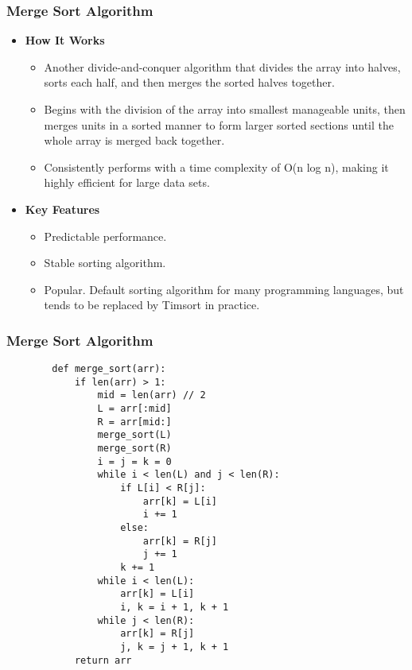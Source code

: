 \documentclass[compress,12pt,bookmark]{beamer}
\begin{document}
\begin{frame}[fragile]
    \frametitle{Merge Sort Algorithm}

    \begin{itemize}
        \item \textbf{How It Works}
              \begin{itemize}
                  \item Another divide-and-conquer algorithm that divides the array into halves, sorts each half, and then merges the sorted halves together.
                  \item Begins with the division of the array into smallest manageable units, then merges units in a sorted manner to form larger sorted sections until the whole array is merged back together.
                  \item Consistently performs with a time complexity of O(n log n), making it highly efficient for large data sets.
              \end{itemize}
        \item \textbf{Key Features}
              \begin{itemize}
                  \item Predictable performance.
                  \item Stable sorting algorithm.
                  \item Popular. Default sorting algorithm for many programming languages, but tends to be replaced by Timsort in practice.
              \end{itemize}
    \end{itemize}
\end{frame}

\begin{frame}[fragile]
    \frametitle{Merge Sort Algorithm}

    \scriptsize
    \begin{verbatim}
        def merge_sort(arr):
            if len(arr) > 1:
                mid = len(arr) // 2
                L = arr[:mid]
                R = arr[mid:]
                merge_sort(L)
                merge_sort(R)
                i = j = k = 0
                while i < len(L) and j < len(R):
                    if L[i] < R[j]:
                        arr[k] = L[i]
                        i += 1
                    else:
                        arr[k] = R[j]
                        j += 1
                    k += 1
                while i < len(L):
                    arr[k] = L[i]
                    i, k = i + 1, k + 1
                while j < len(R):
                    arr[k] = R[j]
                    j, k = j + 1, k + 1
            return arr
    \end{verbatim}
\end{frame}
\end{document}
